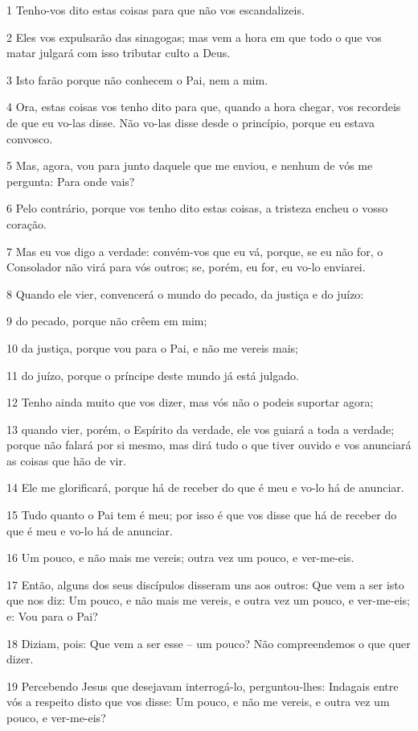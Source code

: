\par 1 Tenho-vos dito estas coisas para que não vos escandalizeis.
\par 2 Eles vos expulsarão das sinagogas; mas vem a hora em que todo o que vos matar julgará com isso tributar culto a Deus.
\par 3 Isto farão porque não conhecem o Pai, nem a mim.
\par 4 Ora, estas coisas vos tenho dito para que, quando a hora chegar, vos recordeis de que eu vo-las disse. Não vo-las disse desde o princípio, porque eu estava convosco.
\par 5 Mas, agora, vou para junto daquele que me enviou, e nenhum de vós me pergunta: Para onde vais?
\par 6 Pelo contrário, porque vos tenho dito estas coisas, a tristeza encheu o vosso coração.
\par 7 Mas eu vos digo a verdade: convém-vos que eu vá, porque, se eu não for, o Consolador não virá para vós outros; se, porém, eu for, eu vo-lo enviarei.
\par 8 Quando ele vier, convencerá o mundo do pecado, da justiça e do juízo:
\par 9 do pecado, porque não crêem em mim;
\par 10 da justiça, porque vou para o Pai, e não me vereis mais;
\par 11 do juízo, porque o príncipe deste mundo já está julgado.
\par 12 Tenho ainda muito que vos dizer, mas vós não o podeis suportar agora;
\par 13 quando vier, porém, o Espírito da verdade, ele vos guiará a toda a verdade; porque não falará por si mesmo, mas dirá tudo o que tiver ouvido e vos anunciará as coisas que hão de vir.
\par 14 Ele me glorificará, porque há de receber do que é meu e vo-lo há de anunciar.
\par 15 Tudo quanto o Pai tem é meu; por isso é que vos disse que há de receber do que é meu e vo-lo há de anunciar.
\par 16 Um pouco, e não mais me vereis; outra vez um pouco, e ver-me-eis.
\par 17 Então, alguns dos seus discípulos disseram uns aos outros: Que vem a ser isto que nos diz: Um pouco, e não mais me vereis, e outra vez um pouco, e ver-me-eis; e: Vou para o Pai?
\par 18 Diziam, pois: Que vem a ser esse -- um pouco? Não compreendemos o que quer dizer.
\par 19 Percebendo Jesus que desejavam interrogá-lo, perguntou-lhes: Indagais entre vós a respeito disto que vos disse: Um pouco, e não me vereis, e outra vez um pouco, e ver-me-eis?
